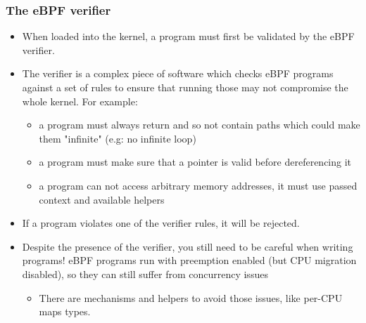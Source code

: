 \begin{frame}[fragile]
  \frametitle{The eBPF verifier}
  \begin{itemize}
    \item When loaded into the kernel, a program must first be validated by the
    eBPF verifier.
    \item The verifier is a complex piece of software which checks eBPF
    programs against a set of rules to ensure that running those may not
    compromise the whole kernel. For example:
    \begin{itemize}
      \item a program must always return and so not contain paths which could
      make them "infinite" (e.g: no infinite loop)
      \item a program must make sure that a pointer is valid before
      dereferencing it
      \item a program can not access arbitrary memory addresses, it must use
      passed context and available helpers
    \end{itemize}
    \item If a program violates one of the verifier rules, it will be rejected.
    \item Despite the presence of the verifier, you still need to be careful when
    writing programs! eBPF programs run with preemption enabled (but CPU
    migration disabled), so they can still suffer from concurrency issues
    \begin{itemize}
      \item There are mechanisms and helpers to avoid those issues, like
        per-CPU maps types.
    \end{itemize}
  \end{itemize}
\end{frame}

